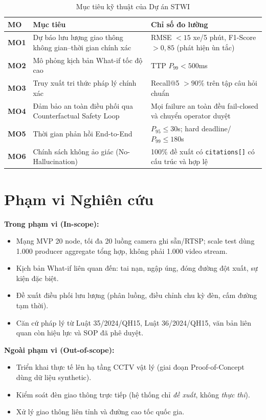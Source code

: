\begin{table}[H]
\centering
\caption{Mục tiêu kỹ thuật của Dự án STWI}
\label{tab:objectives}
\renewcommand{\arraystretch}{1.4}
\begin{tabular}{>{\bfseries}p{0.8cm} p{5.5cm} p{5.5cm}}
\toprule
\textbf{MO} & \textbf{Mục tiêu} & \textbf{Chỉ số đo lường} \\
\midrule
MO1 & Dự báo lưu lượng giao thông không gian--thời gian chính xác & RMSE $< 15$ xe/5 phút, F1-Score $> 0{,}85$ (phát hiện ùn tắc) \\
\rowcolor{rowgray}
MO2 & Mô phỏng kịch bản What-if tốc độ cao & TTP $P_{99} < 500$ms \\
MO3 & Truy xuất tri thức pháp lý chính xác & Recall@5 $> 90\%$ trên tập câu hỏi chuẩn \\
\rowcolor{rowgray}
MO4 & Đảm bảo an toàn điều phối qua Counterfactual Safety Loop & Mọi failure an toàn đều fail-closed và chuyển operator duyệt \\
MO5 & Thời gian phản hồi End-to-End & $P_{95}\leq30$s; hard deadline/$P_{99}\leq180$s \\
\rowcolor{rowgray}
MO6 & Chính sách không ảo giác (No-Hallucination) & 100\% đề xuất có \texttt{citations[]} có cấu trúc và hợp lệ \\
\bottomrule
\end{tabular}
\end{table}

\section{Phạm vi Nghiên cứu}

\textbf{Trong phạm vi (In-scope):}
\begin{itemize}[leftmargin=1.5cm, itemsep=3pt]
  \item Mạng MVP 20 node, tối đa 20 luồng camera ghi sẵn/RTSP; scale test dùng 1.000 producer aggregate tổng hợp, không phải 1.000 video stream.
  \item Kịch bản What-if liên quan đến: tai nạn, ngập úng, đóng đường đột xuất, sự kiện đặc biệt.
  \item Đề xuất điều phối lưu lượng (phân luồng, điều chỉnh chu kỳ đèn, cấm đường tạm thời).
  \item Căn cứ pháp lý từ Luật 35/2024/QH15, Luật 36/2024/QH15, văn bản liên quan còn hiệu lực và SOP đã phê duyệt.
\end{itemize}

\textbf{Ngoài phạm vi (Out-of-scope):}
\begin{itemize}[leftmargin=1.5cm, itemsep=3pt]
  \item Triển khai thực tế lên hạ tầng CCTV vật lý (giai đoạn Proof-of-Concept dùng dữ liệu synthetic).
  \item Kiểm soát đèn giao thông trực tiếp (hệ thống chỉ \textit{đề xuất}, không \textit{thực thi}).
  \item Xử lý giao thông liên tỉnh và đường cao tốc quốc gia.
\end{itemize}

